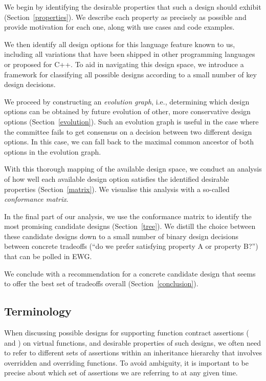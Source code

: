 We begin by identifying the desirable properties that such a design should exhibit (Section~\ref{properties}). We describe each property as precisely as possible and provide motivation for each one, along with use cases and code examples.

We then identify all design options for this language feature known to us, including all variations that have been shipped in other programming languages or proposed for C++. To aid in navigating this design space, we introduce a framework for classifying all possible designs according to a small number of key design decisions.

We proceed by constructing an \emph{evolution graph}, i.e., determining which design options can be obtained by future evolution of other, more conservative design options (Section~\ref{evolution}). Such an evolution graph is useful in the case where the committee fails to get consensus on a decision between two different design options. In this case, we can fall back to the maximal common ancestor of both options in the evolution graph.

With this thorough mapping of the available design space, we conduct an analysis of how well each available design option satisfies the identified desirable properties (Section~\ref{matrix}). We visualise this analysis with a so-called \emph{conformance matrix}. 

In the final part of our analysis, we use the conformance matrix to identify the most promising candidate designs (Section~\ref{tree}). We distill the choice between these candidate designs down to a small number of binary design decisions between concrete tradeoffs (``do we prefer satisfying property A or property B?'') that can be polled in EWG.

We conclude with a recommendation for a concrete candidate design that seems to offer the best set of tradeoffs overall (Section~\ref{conclusion}).


\subsection{Terminology}

When discussing possible designs for supporting function contract assertions ( and ) on virtual functions, and desirable properties of such designs, we often need to refer to different sets of assertions within an inheritance hierarchy that involves overridden and overriding functions. To avoid ambiguity, it is important to be precise about which set of assertions we are referring to at any given time.

